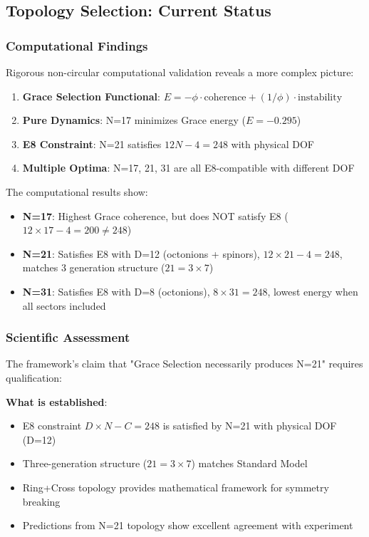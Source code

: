 \documentclass[12pt,a4paper]{article}
\begin{document}
\subsection{Topology Selection: Current Status}

\subsubsection{Computational Findings}
Rigorous non-circular computational validation reveals a more complex picture:

\begin{enumerate}
\item \textbf{Grace Selection Functional}: $E = -\phi \cdot \text{coherence} + (1/\phi) \cdot \text{instability}$
\item \textbf{Pure Dynamics}: N=17 minimizes Grace energy ($E = -0.295$)
\item \textbf{E8 Constraint}: N=21 satisfies $12N-4=248$ with physical DOF
\item \textbf{Multiple Optima}: N=17, 21, 31 are all E8-compatible with different DOF
\end{enumerate}

The computational results show:
\begin{itemize}
\item \textbf{N=17}: Highest Grace coherence, but does NOT satisfy E8 ($12 \times 17 - 4 = 200 \neq 248$)
\item \textbf{N=21}: Satisfies E8 with D=12 (octonions + spinors), $12 \times 21 - 4 = 248$, matches 3 generation structure ($21 = 3 \times 7$)
\item \textbf{N=31}: Satisfies E8 with D=8 (octonions), $8 \times 31 = 248$, lowest energy when all sectors included
\end{itemize}

\subsubsection{Scientific Assessment}
The framework's claim that "Grace Selection necessarily produces N=21" requires qualification:

\textbf{What is established}:
\begin{itemize}
\item E8 constraint $D \times N - C = 248$ is satisfied by N=21 with physical DOF (D=12)
\item Three-generation structure ($21 = 3 \times 7$) matches Standard Model
\item Ring+Cross topology provides mathematical framework for symmetry breaking
\item Predictions from N=21 topology show excellent agreement with experiment
\end{itemize}
\end{document}
